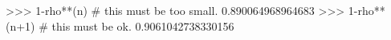 
>>> 1-rho**(n) #  this must be too small.
0.890064968964683
>>> 1-rho**(n+1) # this must be ok.
0.9061042738330156

